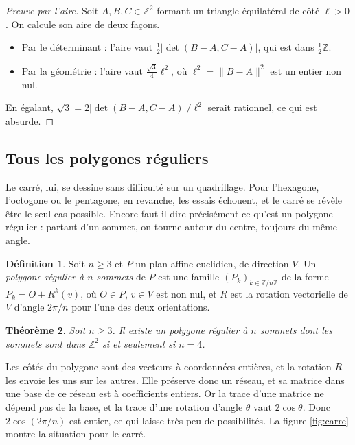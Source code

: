 \documentclass[11pt,a4paper]{article}
\theoremstyle{plain}
\newtheorem{theoreme}{Théorème}[section]
\theoremstyle{definition}
\newtheorem{definition}[theoreme]{Définition}
\theoremstyle{remark}
\newcommand{\Z}{\mathbb{Z}}
\begin{document}
\begin{proof}[Preuve par l'aire]
Soit $A,B,C\in\Z^2$ formant un triangle équilatéral de côté $\ell>0$. On calcule son aire de deux façons.
\begin{itemize}[nosep]
\item Par le déterminant : l'aire vaut $\frac12|\det(B-A,C-A)|$, qui est dans $\frac12\Z$.
\item Par la géométrie : l'aire vaut $\frac{\sqrt3}{4}\ell^2$, où $\ell^2=\|B-A\|^2$ est un entier non nul.
\end{itemize}
En égalant, $\sqrt3=2|\det(B-A,C-A)|/\ell^2$ serait rationnel, ce qui est absurde.
\end{proof}

\subsection{Tous les polygones réguliers}

Le carré, lui, se dessine sans difficulté sur un quadrillage. Pour l'hexagone, l'octogone ou le pentagone, en revanche, les essais échouent, et le carré se révèle être le seul cas possible. Encore faut-il dire précisément ce qu'est un polygone régulier : partant d'un sommet, on tourne autour du centre, toujours du même angle.

\begin{definition}
Soit $n\geq3$ et $P$ un plan affine euclidien, de direction $V$. Un \emph{polygone régulier à $n$ sommets} de $P$ est une famille $(P_k)_{k\in\Z/n\Z}$ de la forme $P_k=O+R^k(v)$, où $O\in P$, $v\in V$ est non nul, et $R$ est la rotation vectorielle de $V$ d'angle $2\pi/n$ pour l'une des deux orientations.
\end{definition}

\begin{theoreme}\label{thm:polygones}
Soit $n\geq3$. Il existe un polygone régulier à $n$ sommets dont les sommets sont dans $\Z^2$ si et seulement si $n=4$.
\end{theoreme}

Les côtés du polygone sont des vecteurs à coordonnées entières, et la rotation $R$ les envoie les uns sur les autres. Elle préserve donc un réseau, et sa matrice dans une base de ce réseau est à coefficients entiers. Or la trace d'une matrice ne dépend pas de la base, et la trace d'une rotation d'angle $\theta$ vaut $2\cos\theta$. Donc $2\cos(2\pi/n)$ est entier, ce qui laisse très peu de possibilités. La figure \ref{fig:carre} montre la situation pour le carré.
\end{document}
